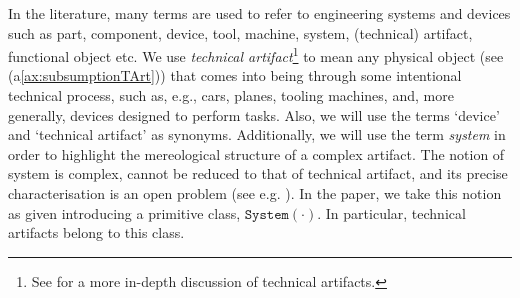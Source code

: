 \documentclass[sw]{iosart2x}
\newcommand{\AxLabel}{\textrm{a}}
\newcommand{\refax}[1]{({\AxLabel}\ref{#1})}
\newcommand{\generalStyle}[1]{\texttt{#1}}
\newcommand{\uniRel}[2]{\generalStyle{#1}(#2)}
\newcommand{\System}[1]{\uniRel{System}{#1}}
\newcommand{\firstTimeKeyWord}[1]{\textit{#1}}
\newcommand{\quotes}[1]{`#1'}
\newcommand{\myComment}[1]{{\unskip \ignorespaces}}
\begin{document}
In the literature, many terms are used to refer to engineering systems and devices such as part, component, device, tool, machine, system, (technical) artifact, functional object etc. 
We use \firstTimeKeyWord{technical artifact}\footnote{See \cite{borgoTechnicalArtifactsIntegrated2017} for a more in-depth discussion of technical artifacts.} to mean any physical object (see \refax{ax:subsumptionTArt}) that comes into being through some intentional technical process, such as, e.g., cars, planes, tooling machines, and, more generally, devices designed to perform tasks. %
Also, we will use the terms \quotes{device} and \quotes{technical artifact} as synonyms. 
Additionally, we will use the term \firstTimeKeyWord{system} in order to highlight the mereological structure of a complex artifact. 
The notion of system is complex, cannot be reduced to  that of technical artifact, and its precise characterisation is an open problem (see e.g. \cite{mizoguchiRoleSystemicView2021}). In the paper, we take this notion as given introducing a primitive class, $\System{\cdot}$. In particular, technical artifacts belong to this class. 
\end{document}
